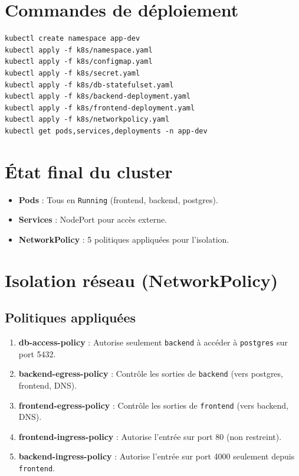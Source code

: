 \documentclass[11pt,a4paper,oneside]{report}
\begin{document}
\section{Commandes de déploiement}
\begin{lstlisting}
kubectl create namespace app-dev
kubectl apply -f k8s/namespace.yaml
kubectl apply -f k8s/configmap.yaml
kubectl apply -f k8s/secret.yaml
kubectl apply -f k8s/db-statefulset.yaml
kubectl apply -f k8s/backend-deployment.yaml
kubectl apply -f k8s/frontend-deployment.yaml
kubectl apply -f k8s/networkpolicy.yaml
kubectl get pods,services,deployments -n app-dev
\end{lstlisting}

\section{État final du cluster}
\begin{itemize}
\item \textbf{Pods} : Tous en \texttt{Running} (frontend, backend, postgres).
\item \textbf{Services} : NodePort pour accès externe.
\item \textbf{NetworkPolicy} : 5 politiques appliquées pour l'isolation.
\end{itemize}

\section{Isolation réseau (NetworkPolicy)}
\subsection{Politiques appliquées}
\begin{enumerate}
\item \textbf{db-access-policy} : Autorise seulement \texttt{backend} à accéder à \texttt{postgres} sur port 5432.
\item \textbf{backend-egress-policy} : Contrôle les sorties de \texttt{backend} (vers postgres, frontend, DNS).
\item \textbf{frontend-egress-policy} : Contrôle les sorties de \texttt{frontend} (vers backend, DNS).
\item \textbf{frontend-ingress-policy} : Autorise l'entrée sur port 80 (non restreint).
\item \textbf{backend-ingress-policy} : Autorise l'entrée sur port 4000 seulement depuis \texttt{frontend}.
\end{enumerate}
\end{document}
